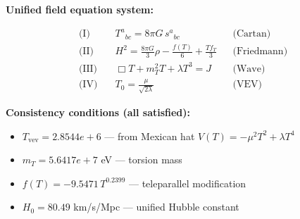 
\textbf{Unified field equation system:}

\begin{align}
  \text{(I)} \quad & T^a{}_{bc} = 8\pi G \, s^a{}_{bc} && \text{(Cartan)} \\
  \text{(II)} \quad & H^2 = \frac{8\pi G}{3}\rho - \frac{f(T)}{6} + \frac{Tf_T}{3} && \text{(Friedmann)} \\
  \text{(III)} \quad & \Box T + m_T^2 T + \lambda T^3 = J && \text{(Wave)} \\
  \text{(IV)} \quad & T_0 = \frac{\mu}{\sqrt{2\lambda}} && \text{(VEV)}
\end{align}

\textbf{Consistency conditions (all satisfied):}
\begin{itemize}
  \item $T_{\text{vev}} = 2.8544e+6$ — from Mexican hat $V(T) = -\mu^2 T^2 + \lambda T^4$
  \item $m_T = 5.6417e+7$ eV — torsion mass
  \item $f(T) = -9.5471 \, T^{0.2399}$ — teleparallel modification
  \item $H_0 = 80.49$ km/s/Mpc — unified Hubble constant
\end{itemize}